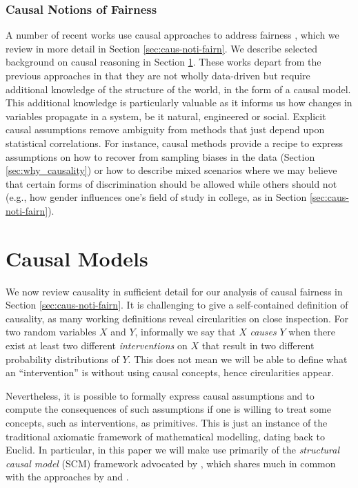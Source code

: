 \documentclass{article}
\begin{document}
\subsubsection{Causal Notions of Fairness}
A number of recent works use causal approaches to address fairness 
\cite{kusner:17, elias:18, silvia:18, pmlr-v81-barabas18a, russell:17, kilbertus:17}, which we review in more detail
in Section \ref{sec:caus-noti-fairn}. We describe selected background on
causal reasoning in Section \ref{sec:causal}. These works depart from the previous
approaches in that they are not wholly data-driven but require additional
knowledge of the structure of the world, in the form of a causal model.  
This additional knowledge is particularly valuable as it informs us how
changes in variables propagate in a system, be it natural, engineered or social. Explicit causal assumptions remove ambiguity from methods that just depend upon
statistical correlations. For instance, causal methods provide a recipe to express assumptions on how to recover from sampling biases in the data (Section \ref{sec:why_causality}) or how to describe mixed scenarios where we may believe that certain forms of discrimination should be allowed while others should not (e.g., how gender influences one's field of study in college, as in Section \ref{sec:caus-noti-fairn}). 

\section{Causal Models}
\label{sec:causal}
We now review causality in sufficient detail for our analysis of causal fairness
in Section \ref{sec:caus-noti-fairn}.  
It is challenging to give a self-contained definition of causality, as many working definitions reveal 
circularities on close inspection. For two random variables $X$ and $Y$, informally we say
that $X$ \emph{causes} $Y$ when there exist at least two different
\emph{interventions} on $X$ that result in two different probability distributions
of $Y$. This does not mean we will be able to define what an
``intervention'' is without using causal concepts, hence circularities
appear.

Nevertheless, it is possible to formally express causal assumptions
and to compute the consequences of such assumptions if one is willing
to treat some concepts, such as interventions, as primitives. This is just an instance of the
traditional axiomatic framework of mathematical modelling, dating back to
Euclid. In particular, in this paper we will make use primarily of the
\emph{structural causal model} (SCM) framework advocated by
\cite{pearl:00}, which shares much in common with the approaches by
 \cite{robins:86} and \cite{sgs:93}. 
\end{document}
